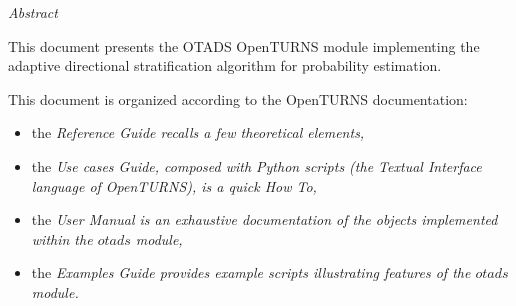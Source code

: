 %  
\vspace{0.5in}
\begin{center}
\vspace{0.3in}
\emph{ Abstract}
\vspace{0.5in}
\end{center}

This document presents the OTADS OpenTURNS module implementing the adaptive directional stratification algorithm for probability estimation.

This document is organized according to the OpenTURNS documentation:
\begin{itemize}
    \item the \itshape{Reference Guide} recalls a few theoretical elements,
    \item the \itshape{Use cases Guide}, composed with Python scripts (the Textual Interface language of OpenTURNS), is a quick How To,
    \item the \itshape{User Manual} is an exhaustive documentation of the objects  implemented within the $otads$ module,
    \item the \itshape{Examples Guide} provides example scripts illustrating features of the $otads$ module.
\end{itemize}

